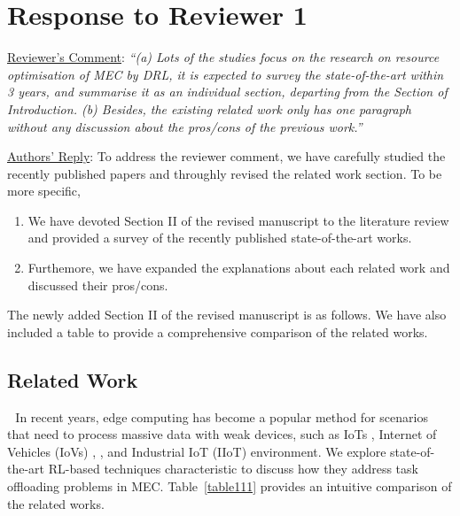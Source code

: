\documentclass[12pt,draftclsnofoot,onecolumn]{IEEEtran}
\newcommand{\rev}[1]{{\color{blue}#1}} %
\newcommand{\rev}[1]{#1}
\newenvironment{my}[2]%
{\begin{list}{}%
{\setlength{\rightmargin}{#1}\setlength{\leftmargin}{#2}}%


 \item[]{}

} {\end{list}}
\begin{document}
\setcounter{section}{0}
\renewcommand*{\thesection}{\Roman{section}}
\makeatletter
\setcounter{table}{0}

\section{Response to Reviewer 1}
\begin{enumerate}
\label{section:300}
\item \underline{Reviewer's Comment}: 
\textit{``(a) Lots of the studies focus on the research on resource optimisation of MEC by DRL, it is expected to survey the state-of-the-art within 3 years, and summarise it as an individual section, departing from the Section of Introduction. (b) Besides, the existing related work only has one paragraph without any discussion about the pros/cons of the previous work.''} \newline

\underline{Authors' Reply}: To address the reviewer comment, we have carefully studied the recently published papers and throughly revised the related work section. To be more specific,
\begin{enumerate}[]
\item We have devoted Section II of the revised manuscript to the literature review and provided a survey of the recently published state-of-the-art works.
\item Furthemore, we have expanded the explanations about each related work and discussed their pros/cons.
\end{enumerate}\vspace{6mm}
The newly added Section II of the revised manuscript is as follows. We have also included a table to provide a comprehensive comparison of the related works. \newline
\begin{my}{1cm}{1cm}
	\rev{\setcounter{section}{1}
\section{Related Work}
\label{section:II}
\,\,\,\,In recent years, edge computing has become a popular method for scenarios that need to process massive data with weak devices, such as IoTs \cite{zhang2023multi}, Internet of Vehicles (IoVs) \cite{lin2022multi}, \cite{wei2023many}, and Industrial IoT (IIoT) \cite{yuan2023adaptive} environment.
		We explore state-of-the-art RL-based techniques characteristic to discuss how they address task offloading problems in MEC. Table~\ref{table111} provides an intuitive comparison of the related works.
}
\end{my}
\end{enumerate}
\end{document}
